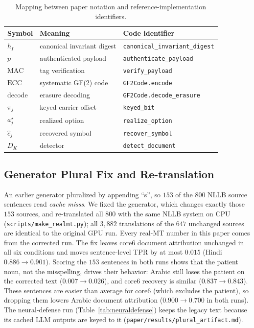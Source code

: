 \documentclass[journal]{IEEEtran}
\begin{document}
\begin{table}[t]
\centering
\caption{Mapping between paper notation and reference-implementation identifiers.}
\label{tab:notation}
\renewcommand{\arraystretch}{1.2}
\footnotesize
\begin{tabularx}{\linewidth}{@{}l>{\raggedright\arraybackslash}X>{\raggedright\arraybackslash}X@{}}
\toprule
Symbol & Meaning & Code identifier \\
\midrule
$h_I$ & canonical invariant digest & \texttt{canonical\_\allowbreak invariant\_\allowbreak digest} \\
$p$ & authenticated payload & \texttt{authenticate\_\allowbreak payload} \\
$\mathrm{MAC}$ & tag verification & \texttt{verify\_payload} \\
$\mathrm{ECC}$ & systematic GF(2) code & \texttt{GF2Code.encode} \\
decode & erasure decoding & \texttt{GF2Code.\allowbreak decode\_\allowbreak erasure} \\
$\pi_j$ & keyed carrier offset & \texttt{keyed\_bit} \\
$a_j^\star$ & realized option & \texttt{realize\_option} \\
$\hat c_j$ & recovered symbol & \texttt{recover\_symbol} \\
$D_K$ & detector & \texttt{detect\_document} \\
\bottomrule
\end{tabularx}
\end{table}

\subsection{Generator Plural Fix and Re-translation}
\label{app:plural}
An earlier generator pluralized by appending ``s'', so $153$ of the $800$ NLLB source sentences read \emph{cache misss}. We fixed the generator, which changes exactly those $153$ sources, and re-translated all $800$ with the same NLLB system on CPU (\texttt{scripts/\allowbreak make\_realmt.py}); all $3{,}882$ translations of the $647$ unchanged sources are identical to the original GPU run. Every real-MT number in this paper comes from the corrected run. The fix leaves core6 document attribution unchanged in all six conditions and moves sentence-level TPR by at most $0.015$ (Hindi $0.886\to0.901$). Scoring the $153$ sentences in both runs shows that the patient noun, not the misspelling, drives their behavior: Arabic still loses the patient on the corrected text ($0.007\to0.026$), and core6 recovery is similar ($0.837\to0.843$). These sentences are easier than average for core6 (which excludes the patient), so dropping them lowers Arabic document attribution ($0.900\to0.700$ in both runs). The neural-defense run (Table~\ref{tab:neuraldefense}) keeps the legacy text because its cached LLM outputs are keyed to it (\texttt{paper/results/plural\_artifact.md}).
\end{document}
